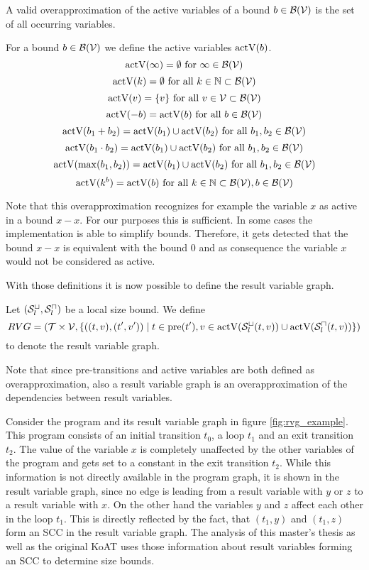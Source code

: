 A valid overapproximation of the active variables of a bound $b \in \mathcal{B}(\mathcal{V})$ is the set of all occurring variables.
\begin{definition}
  For a bound $b \in \mathcal{B}(\mathcal{V})$ we define the active variables $\text{actV}(b)$.
  \[ \text{actV}(\infty) = \emptyset \text{ for } \infty \in \mathcal{B}(\mathcal{V}) \]
  \[ \text{actV}(k) = \emptyset \text{ for all } k \in \mathbb{N} \subset \mathcal{B}(\mathcal{V}) \] 
  \[ \text{actV}(v) = \lbrace v \rbrace \text{ for all } v \in \mathcal{V} \subset \mathcal{B}(\mathcal{V}) \] 
  \[ \text{actV}(-b) = \text{actV}(b) \text{ for all } b \in \mathcal{B}(\mathcal{V}) \] 
  \[ \text{actV}(b_1 + b_2) = \text{actV}(b_1) \cup \text{actV}(b_2) \text{ for all } b_1, b_2 \in \mathcal{B}(\mathcal{V}) \] 
  \[ \text{actV}(b_1 \cdot b_2) = \text{actV}(b_1) \cup \text{actV}(b_2) \text{ for all } b_1, b_2 \in \mathcal{B}(\mathcal{V}) \] 
  \[ \text{actV}(\max(b_1, b_2)) = \text{actV}(b_1) \cup \text{actV}(b_2) \text{ for all } b_1, b_2 \in \mathcal{B}(\mathcal{V}) \]
  \[ \text{actV}(k^b) = \text{actV}(b) \text{ for all } k \in \mathbb{N} \subset \mathcal{B}(\mathcal{V}), b \in \mathcal{B}(\mathcal{V}) \]  
\end{definition}

Note that this overapproximation recognizes for example the variable $x$ as active in a bound $x - x$.
For our purposes this is sufficient.
In some cases the implementation is able to simplify bounds.
Therefore, it gets detected that the bound $x - x$ is equivalent with the bound $0$ and as consequence the variable $x$ would not be considered as active.

With those definitions it is now possible to define the result variable graph.

\begin{definition}
	Let ${({\mathcal{S}^\sqcup_l}, {\mathcal{S}^\sqcap_l})}$ be a local size bound.
	We define 
	\[ RVG = (\mathcal{T} \times \mathcal{V}, \lbrace ((t, v), (t', v')) \mid t \in \text{pre}(t'), v \in \text{actV}({\mathcal{S}^\sqcup_l}(t,v)) \cup \text{actV}({\mathcal{S}^\sqcap_l}(t,v)) \rbrace) \]
	to denote the result variable graph.
\end{definition}

Note that since pre-transitions and active variables are both defined as overapproximation, also a result variable graph is an overapproximation of the dependencies between result variables.

Consider the program and its result variable graph in figure \ref{fig:rvg_example}.
This program consists of an initial transition $t_0$, a loop $t_1$ and an exit transition $t_2$.
The value of the variable $x$ is completely unaffected by the other variables of the program and gets set to a constant in the exit transition $t_2$.
While this information is not directly available in the program graph, it is shown in the result variable graph, since no edge is leading from a result variable with $y$ or $z$ to a result variable with $x$.
On the other hand the variables $y$ and $z$ affect each other in the loop $t_1$.
This is directly reflected by the fact, that $(t_1,y)$ and $(t_1,z)$ form an SCC in the result variable graph.
The analysis of this master's thesis as well as the original KoAT uses those information about result variables forming an SCC to determine size bounds.
